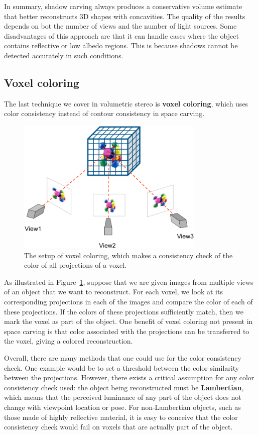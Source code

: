 \documentclass[a4paper, 12pt]{article}
\renewcommand\emph{\textbf}
\numberwithin{equation}{section}
\begin{document}
In summary, shadow carving always produces a conservative volume estimate that better reconstructs 3D shapes with concavities. The quality of the results depends on bot the number of views and the number of light sources. Some disadvantages of this approach are that it can handle cases where the object contains reflective or low albedo regions. This is because shadows cannot be detected accurately in such conditions.

\subsection{Voxel coloring}
The last technique we cover in volumetric stereo is \emph{voxel coloring}, which uses color consistency instead of contour consistency in space carving.

\begin{figure}[h!]
    \centering
    \includegraphics[width = 0.8\textwidth]{figures/voxel_coloring.png}
    \caption{The setup of voxel coloring, which makes a consistency check of the color of all projections of a voxel.}
    \label{fig:voxel_coloring}
\end{figure}

As illustrated in Figure~\ref{fig:voxel_coloring}, suppose that we are given images from multiple views of an object that we want to reconstruct. For each voxel, we look at its corresponding projections in each of the images and compare the color of each of these projections. If the colors of these projections sufficiently match, then we mark the voxel as part of the object. One benefit of voxel coloring not present in space carving is that color associated with the projections can be transferred to the voxel, giving a colored reconstruction.

Overall, there are many methods that one could use for the color consistency check. One example would be to set a threshold between the color similarity between the projections. However, there exists a critical assumption for any color consistency check used: the object being reconstructed must be \emph{Lambertian}, which means that the perceived luminance of any part of the object does not change with viewpoint location or pose. For non-Lambertian objects, such as those made of highly reflective material, it is easy to conceive that the color consistency check would fail on voxels that are actually part of the object.
\end{document}
